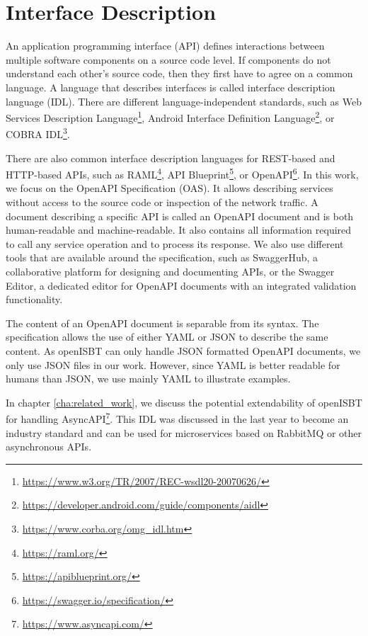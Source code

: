\section{Interface Description}
\label{sec:background_open_api}

An application programming interface (API) defines interactions between multiple software components on a source code level. If components do not understand each other's source code, then they first have to agree on a common language. A language that describes interfaces is called interface description language (IDL). There are different language-independent standards, such as Web Services Description Language\footnote{\url{https://www.w3.org/TR/2007/REC-wsdl20-20070626/}}, Android Interface Definition Language\footnote{\url{https://developer.android.com/guide/components/aidl}}, or COBRA IDL\footnote{\url{https://www.corba.org/omg_idl.htm}}. 


There are also common interface description languages for REST-based and HTTP-based APIs, such as RAML\footnote{\url{https://raml.org/}}, API Blueprint\footnote{\url{https://apiblueprint.org/}}, or OpenAPI\footnote{\url{https://swagger.io/specification/}}.
In this work, we focus on the OpenAPI Specification (OAS). It allows describing services without access to the source code or inspection of the network traffic. A document describing a specific API is called an OpenAPI document and is both human-readable and machine-readable. It also contains all information required to call any service operation and to process its response. We also use different tools that are available around the specification, such as SwaggerHub, a collaborative platform for designing and documenting APIs, or the Swagger Editor, a dedicated editor for OpenAPI documents with an integrated validation functionality. 


The content of an OpenAPI document is separable from its syntax. The specification allows the use of either YAML or JSON to describe the same content. As openISBT can only handle JSON formatted OpenAPI documents, we only use JSON files in our work. However, since YAML is better readable for humans than JSON, we use mainly YAML to illustrate examples.


In chapter \ref{cha:related_work}, we discuss the potential extendability of openISBT for handling AsyncAPI\footnote{\url{https://www.asyncapi.com/}}. This IDL was discussed in the last year to become an industry standard \cite{AsyncAPI_industry_standard} and can be used for microservices based on RabbitMQ or other asynchronous APIs. 